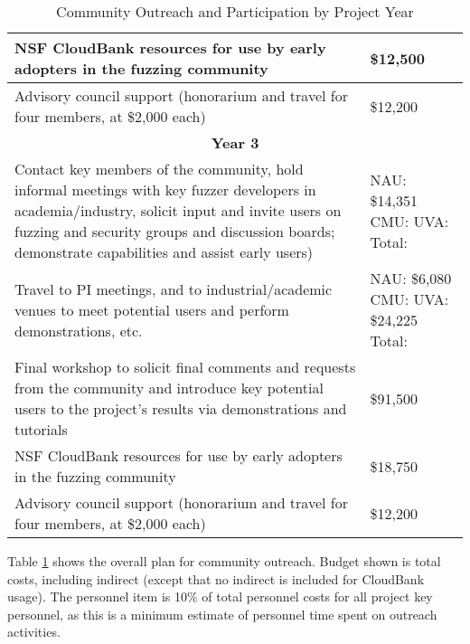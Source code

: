 \documentclass[12pt]{article}
\begin{document}
\begin{table}
\begin{tabular}{|p{12cm}|p{3cm}|}
    \hline
    NSF CloudBank resources for use by early adopters in the fuzzing 
    community & \$12,500 \\
    \hline 
    Advisory council support (honorarium and travel for four members, 
    at \$2,000 each) & \$12,200 \\    
    \hline
    \hline
    \multicolumn{2}{c}{{\bf Year 3}} \\
    \hline
    \hline
   Contact key members of the community, hold informal meetings with
    key fuzzer developers in academia/industry, solicit input and
    invite users
    on fuzzing and security groups and discussion boards; demonstrate
    capabilities and assist early users) &  NAU:  \$14,351 CMU: UVA:
                                                      Total:  \\
    \hline
    Travel to PI meetings, and to industrial/academic venues to meet
    potential users and perform demonstrations, etc. & NAU: \$6,080 CMU: UVA:  \$24,225 Total:\\
    \hline    
    Final workshop to solicit final comments and requests from the
    community and introduce key potential users to the project’s
    results via demonstrations and tutorials & \$91,500 \\
    \hline
    NSF CloudBank resources for use by early adopters in the fuzzing 
    community & \$18,750 \\
    \hline 
    Advisory council support (honorarium and travel for four members, 
    at \$2,000 each) & \$12,200 \\    
    \hline    
 
  \end{tabular}
  \caption{Community Outreach and Participation by Project Year}
  \label{tab:outreach}
  
\end{table}


Table \ref{tab:outreach} shows the overall plan for community
outreach.   Budget shown is total costs, including indirect (except
that no indirect is included for CloudBank usage).  The personnel item is 10\%
of total personnel costs for all project key personnel, as this is a
minimum estimate of personnel time spent on outreach activities.
\end{document}
